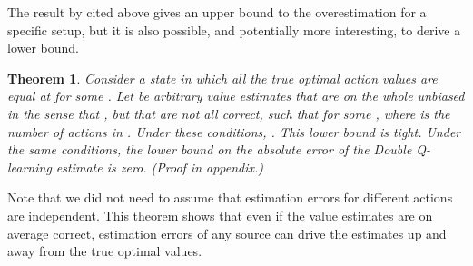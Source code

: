 \documentclass[letterpaper]{article}
\newtheorem{theorem}{Theorem}
\begin{document}
The result by \citet{Thrun:1993} cited above gives an upper bound to the overestimation for a specific setup, but it is also possible, and potentially more interesting, to derive a lower bound.
\begin{theorem}\label{thm:lower_bound}
Consider a state  in which all the true optimal action values are equal at  for some . Let  be arbitrary value estimates that are on the whole unbiased in the sense that , but that are not all correct, such that  for some , where  is the number of actions in . Under these conditions, .  This lower bound is tight. Under the same conditions, the lower bound on the absolute error of the Double Q-learning estimate is zero. (Proof in appendix.)
\end{theorem}
Note that we did not need to assume that estimation errors for different actions are independent.
This theorem shows that even if the value estimates are on average correct, estimation errors of any source can drive the estimates up and away from the true optimal values.
\end{document}
